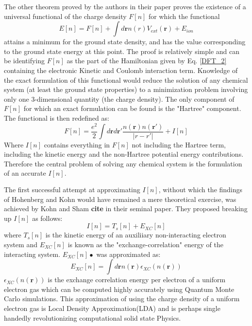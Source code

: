 \documentclass[12pt,a4paper]{article}
\newcommand{\rmb}{\mathbf{r}}
\newcommand{\dens}{n(\rmb)}
\begin{document}
The other theorem proved by the authors in their paper proves the existence of   a universal functional of the charge density $F[n]$ for which the functional
\begin{equation}
E[n]=F[n] +\int d \rmb n(r) V_{ext}(\rmb) + E_{ion} 
\end{equation}
attains a minimum for the ground state density, and has the value corresponding to the ground state energy at this point. The proof is relatively simple and can be identifying $F[n]$ as the part of the Hamiltonian given by Eq. \ref{DFT_2} containing the electronic Kinetic and Coulomb interaction term. Knowledge of the exact formulation of this functional would reduce the solution of any chemical system (at least the ground state properties) to a minimization problem involving only one 3-dimensional quantity (the charge density). The only component of $F[n]$ for which an exact formulation can be found is the "Hartree" component. The functional is then redefined as:
\begin{equation}
 F[n]= \dfrac{e^2}{2}\int d\rmb d\rmb' \dfrac{n(\rmb) n(\rmb')}{|r-r'|} + I[n]
 \end{equation} 
Where $I[n]$ contains everything in $F[n]$ not including the Hartree term, including the kinetic energy and the non-Hartree potential energy contributions. Therefore the central problem of solving any chemical system is the formulation of an accurate $I[n]$.

The first successful attempt at approximating $I[n]$, without which the findings of Hohenberg and Kohn would have remained a mere theoretical exercise, was achieved by Kohn and Sham \textbf{cite} in their seminal paper. They proposed breaking up $I[n]$ as follows:
\begin{equation}
 I[n]=T_s[n]+E_{XC}[n]
 \end{equation} 
where $T_s[n]$ is the kinetic energy of an auxiliiary non-interacting electron system and $E_{XC}[n]$ is known as the "exchange-correlation" energy of the interacting system. $E_{XC}[n]•$ was approximated as:
\begin{equation}
E_{XC}[n]=\int d\rmb \dens \epsilon_{XC}(\dens)
\end{equation}
$\epsilon_{XC}(\dens)$ is the exchange correlation energy per electron of a uniform electron gas which can be computed highly accurately using Quantum Monte Carlo simulations. This approximation of using the charge density of a uniform electron gas is Local Density Approximation(LDA) and is perhaps single handedly revolutionizing computational solid state Physics. 
\end{document}
